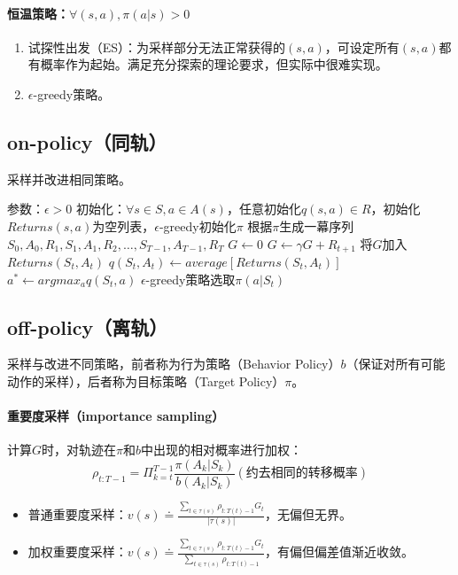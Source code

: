 \documentclass[
12pt, %
a4paper, 
oneside, %
headinclude,footinclude, %
]{scrartcl}
\begin{document}
\paragraph{恒温策略：$ \forall(s, a), \pi(a|s) > 0 $}
\begin{enumerate}
\item 试探性出发（ES）：为采样部分无法正常获得的$ (s, a) $，可设定所有$ (s, a) $都有概率作为起始。满足充分探索的理论要求，但实际中很难实现。
\item $ \epsilon $-greedy策略。
\end{enumerate}
\subsection[on-policy]{on-policy（同轨）}
采样并改进相同策略。
\begin{myalgorithm}
\State 参数：$ \epsilon > 0 $
\State 初始化：$ \forall s \in S, a \in A(s) $，任意初始化$ q(s,a) \in R $，初始化$ Returns(s,a) $为空列表，$ \epsilon $-greedy初始化$ \pi $
\Loop
\State 根据$ \pi $生成一幕序列$ S_0, A_0, R_1, S_1, A_1, R_2, \dots, S_{T - 1}, A_{T - 1}, R_T $
\State $ G \gets 0 $
\State $ G \gets \gamma G + R_{t + 1} $
\State 将$ G $加入$ Returns(S_t,A_t) $
\State $ q(S_t, A_t) \gets average[Returns(S_t, A_t)] $
\State $ a^* \gets argmax_a q(S_t, a) $
\State $ \epsilon $-greedy策略选取$ \pi(a|S_t) $
\EndIf
\EndFor
\EndLoop
\end{myalgorithm}
\subsection[off-policy]{off-policy（离轨）}
采样与改进不同策略，前者称为行为策略（Behavior Policy）$ b $（保证对所有可能动作的采样），后者称为目标策略（Target Policy）$ \pi $。
\paragraph{重要度采样（importance sampling）}\label{sec:MC back}
计算$ G $时，对轨迹在$ \pi $和$ b $中出现的相对概率进行加权：
$$ \rho_{t:T - 1} = \Pi_{k = t}^{T - 1} \frac{\pi(A_k|S_k)}{b(A_k|S_k)} (\text{约去相同的转移概率}) $$
\begin{itemize}
\item 普通重要度采样：$ v(s) \doteq \frac{\sum_{t \in \tau(s)} \rho_{t:T(t) - 1}G_t}{|\tau(s)|} $，无偏但无界。
\item 加权重要度采样：$ v(s) \doteq \frac{\sum_{t \in \tau(s)} \rho_{t:T(t) - 1}G_t}{\sum_{t \in \tau(s)} \rho_{t:T(t) - 1}} $，有偏但偏差值渐近收敛。
\end{itemize}
\end{document}
